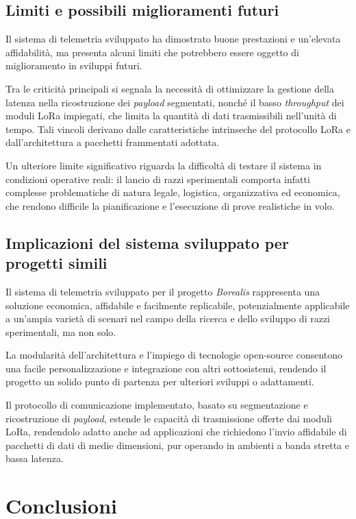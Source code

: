 \documentclass[12pt,a4paper,twoside]{book}
\begin{document}
\newpage

\section{Limiti e possibili miglioramenti futuri}
Il sistema di telemetria sviluppato ha dimostrato buone prestazioni e un'elevata
affidabilità, ma presenta alcuni limiti che potrebbero essere oggetto di
miglioramento in sviluppi futuri.

Tra le criticità principali si segnala la necessità di ottimizzare la gestione
della latenza nella ricostruzione dei \emph{payload} segmentati, nonché il basso
\emph{throughput} dei moduli \ac{LoRa} impiegati, che limita la quantità di dati
trasmissibili nell’unità di tempo. Tali vincoli derivano dalle caratteristiche
intrinseche del protocollo LoRa e dall’architettura a pacchetti frammentati adottata.

Un ulteriore limite significativo riguarda la difficoltà di testare il sistema
in condizioni operative reali: il lancio di razzi sperimentali comporta infatti
complesse problematiche di natura legale, logistica, organizzativa ed economica,
che rendono difficile la pianificazione e l’esecuzione di prove realistiche in volo.

\section{Implicazioni del sistema sviluppato per progetti simili}
Il sistema di telemetria sviluppato per il progetto \emph{Borealis} rappresenta
una soluzione economica, affidabile e facilmente replicabile, potenzialmente
applicabile a un'ampia varietà di scenari nel campo della ricerca e dello sviluppo
di razzi sperimentali, ma non solo.

La modularità dell'architettura e l’impiego di tecnologie open-source consentono
una facile personalizzazione e integrazione con altri sottosistemi, rendendo il
progetto un solido punto di partenza per ulteriori sviluppi o adattamenti.

Il protocollo di comunicazione implementato, basato su segmentazione e
ricostruzione di \emph{payload}, estende le capacità di trasmissione offerte dai
moduli \ac{LoRa}, rendendolo adatto anche ad applicazioni che richiedono l’invio
affidabile di pacchetti di dati di medie dimensioni, pur operando in ambienti a
banda stretta e bassa latenza.

\chapter{Conclusioni} \label{chap:conclusion}
\end{document}
